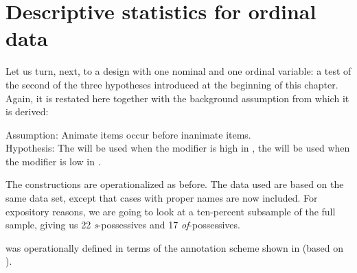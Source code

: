 
\section{Descriptive statistics for ordinal data}
\label{sec:descriptiveordinal}

Let us turn, next, to a design  with one nominal  and one ordinal  variable: a test of the second of the three hypotheses  introduced at the beginning of this chapter. Again, it is restated here together with the background assumption from which it is derived:

\begin{exe}
\ex Assumption: Animate  items occur before inanimate items.\\
Hypothesis:  The  will be used when the modifier is high in , the   will be used when the modifier is low in .
\label{ex:animacyhypothesis}
\end{exe}

The constructions are operationalized  as before. The data used are based on the same data set, except that cases with proper names are now included. For expository reasons, we are going to look at a ten\hyp{}percent subsample of the full sample, giving us 22 \textit{s}-possessives  and 17 \textit{of}-possessives.

  was operationally defined in terms of the annotation  scheme shown in  (based on \citealt{zaenen_animacy_2004}).

